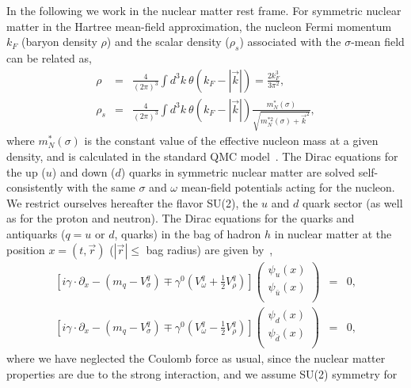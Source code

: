 \documentclass[preprint,aps,showpacs,floatfix]{revtex4}
\def\Qbar{\overline{Q}}
\begin{document}
In the following we work in the nuclear matter rest frame.
For symmetric nuclear matter in the Hartree mean-field approximation, 
the nucleon Fermi momentum $k_F$ (baryon density $\rho$) 
and the scalar density ($\rho_s$) associated with
the $\sigma$-mean field can be related as,
%
\begin{eqnarray}
\rho &=& \frac{4}{(2\pi)^3}\int d^3k\ \theta (k_F - |\vec{k}|)
= \frac{2 k_F^3}{3\pi^2},
\label{rhoB}\\
\rho_s &=& \frac{4}{(2\pi)^3}\int d^3k \ \theta (k_F - |\vec{k}|)
\frac{m_N^*(\sigma)}{\sqrt{m_N^{* 2}(\sigma)+\vec{k}^2}},
\label{rhos}
\end{eqnarray}
%
where $m_N^*(\sigma)$ is the constant value of the effective nucleon
mass at a given density, and is calculated in the standard QMC model~\cite{Guichon,QMCfinite,QMCreview}.
The Dirac equations for the up ($u$) and down ($d$) 
quarks in symmetric nuclear matter are solved
self-consistently with the same $\sigma$ and $\omega$ mean-field potentials 
acting for the nucleon.
We restrict ourselves hereafter the flavor SU(2), the $u$ and $d$ quark sector 
(as well as for the proton and neutron).
The Dirac equations for the quarks and antiquarks
($q = u$ or $d$, quarks)
in the bag of hadron $h$ in nuclear matter at the position
$x=(t,\vec{r})$ ($|\vec{r}| \le$ bag radius) are given by~\cite{QMCreview},
%
\begin{eqnarray}
\left[ i \gamma \cdot \partial_x -
(m_q - V^q_\sigma)
\mp \gamma^0
\left( V^q_\omega +
\frac{1}{2} V^q_\rho
\right) \right]
\left( \begin{array}{c} \psi_u(x)  \\
\psi_{\bar{u}}(x) \\ \end{array} \right) &=& 0,
\label{diracu}\\
%
\left[ i \gamma \cdot \partial_x -
(m_q - V^q_\sigma)
\mp \gamma^0
\left( V^q_\omega -
\frac{1}{2} V^q_\rho
\right) \right]
\left( \begin{array}{c} \psi_d(x)  \\
\psi_{\bar{d}}(x) \\ \end{array} \right) &=& 0,
\label{diracd}
%
\end{eqnarray}
%
where we have neglected the Coulomb force as usual, since the nuclear matter
properties are due to the strong interaction, and we assume SU(2) symmetry for 
\end{document}
